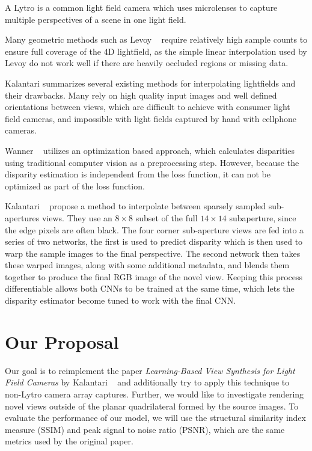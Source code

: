 \documentclass[10pt,twocolumn,letterpaper]{article}
\begin{document}
A Lytro is a common light field camera which uses microlenses to capture multiple
perspectives of a scene in one light field. 

Many geometric methods such as Levoy \etal~\cite{levoy1996light} require relatively high sample counts to ensure full
coverage of the 4D lightfield, as the simple linear interpolation used by Levoy
do not work well if there are heavily occluded regions or missing data.

Kalantari summarizes several existing methods for interpolating lightfields and their drawbacks.
Many rely on high quality input images and well defined orientations between views,
which are difficult to achieve with consumer light field cameras, and impossible with light fields
captured by hand with cellphone cameras.

Wanner \etal~\cite{Wanner} utilizes an optimization based approach, which calculates disparities
using traditional computer vision as a preprocessing step. However, because the disparity estimation
is independent from the loss function, it can not be optimized as part of the loss function. 

Kalantari \etal~\cite{LearningViewSynthesis} propose a method to interpolate between 
sparsely sampled sub-apertures views. They use an $8 \times 8$ subset of the full $14 \times 14$ subaperture, since the
edge pixels are often black. The four corner sub-aperture views are fed into a series of two 
networks, the first is used to predict disparity which is then used to warp the sample images to the final perspective.
The second network then takes these warped images, along with some additional metadata, and blends them together
to produce the final RGB image of the novel view. Keeping this process differentiable allows both CNNs to 
be trained at the same time, which lets the disparity estimator become tuned to work with the final CNN.

\section{Our Proposal}

Our goal is to reimplement the paper \textit{Learning-Based View Synthesis for Light Field Cameras} by 
Kalantari \etal~\cite{LearningViewSynthesis} and additionally try to apply this technique to non-Lytro camera
array captures. Further, we would like to investigate rendering novel views outside of the planar
quadrilateral formed by the source images. To evaluate the performance of our model, we will use 
the structural similarity index measure (SSIM) and peak signal to noise ratio (PSNR), which are the 
same metrics used by the original paper.
\end{document}
